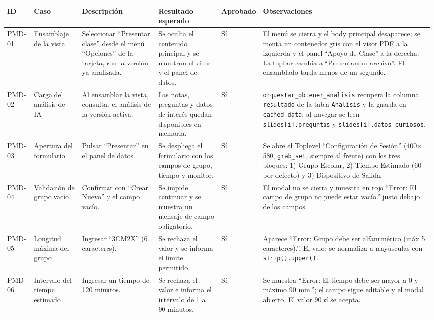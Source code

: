 \documentclass[12pt,letterpaper]{article}
\begin{document}
{\tiny
\renewcommand{\arraystretch}{1.15}
\begin{longtable}{|L{1.1cm}|L{2.3cm}|L{3.2cm}|L{3.6cm}|L{1.2cm}|L{3.6cm}|}
\hline
\textbf{ID} & \textbf{Caso} & \textbf{Descripción} & \textbf{Resultado esperado} & \textbf{Aprobado} & \textbf{Observaciones} \\ \hline
\endhead
PMD-01 & Ensamblaje de la vista & Seleccionar ``Presentar clase'' desde el menú ``Opciones'' de la tarjeta, con la versión ya analizada. & Se oculta el contenido principal y se muestran el visor y el panel de datos. & Sí & El menú se cierra y el body principal desaparece; se monta un contenedor gris con el visor PDF a la izquierda y el panel ``Apoyo de Clase'' a la derecha. La topbar cambia a ``Presentando: archivo''. El ensamblado tarda menos de un segundo. \\ \hline
PMD-02 & Carga del análisis de IA & Al ensamblar la vista, consultar el análisis de la versión activa. & Las notas, preguntas y datos de interés quedan disponibles en memoria. & Sí & \texttt{orquestar\_obtener\_analisis} recupera la columna \texttt{resultado} de la tabla \texttt{Analisis} y la guarda en \texttt{cached\_data}; al navegar se leen \texttt{slides[i].preguntas} y \texttt{slides[i].datos\_curiosos}. \\ \hline
PMD-03 & Apertura del formulario & Pulsar ``Presentar'' en el panel de datos. & Se despliega el formulario con los campos de grupo, tiempo y monitor. & Sí & Se abre el Toplevel ``Configuración de Sesión'' (400$\times$580, \texttt{grab\_set}, siempre al frente) con los tres bloques: 1) Grupo Escolar, 2) Tiempo Estimado (60 por defecto) y 3) Dispositivo de Salida. \\ \hline
PMD-04 & Validación de grupo vacío & Confirmar con ``Crear Nuevo'' y el campo vacío. & Se impide continuar y se muestra un mensaje de campo obligatorio. & Sí & El modal no se cierra y muestra en rojo ``Error: El campo de grupo no puede estar vacío.'' justo debajo de los campos. \\ \hline
PMD-05 & Longitud máxima del grupo & Ingresar ``3CM2X'' (6 caracteres). & Se rechaza el valor y se informa el límite permitido. & Sí & Aparece ``Error: Grupo debe ser alfanumérico (máx 5 caracteres).''. El valor se normaliza a mayúsculas con \texttt{strip().upper()}. \\ \hline
PMD-06 & Intervalo del tiempo estimado & Ingresar un tiempo de 120 minutos. & Se rechaza el valor e informa el intervalo de 1 a 90 minutos. & Sí & Se muestra ``Error: El tiempo debe ser mayor a 0 y máximo 90 min.''; el campo sigue editable y el modal abierto. El valor 90 sí se acepta. \\ \hline

\end{longtable}}
\end{document}
